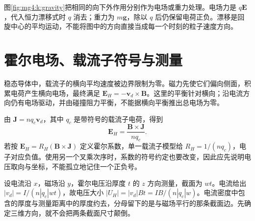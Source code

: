图\ref{fig:mg4:k:gravity}把相同的向下外作用分别作为电场或重力处理。电场力是 $q\bm E$，代入恒力漂移式时 $q$ 消去；重力为 $m\bm g$，除以 $q$ 后仍保留电荷正负。漂移是回旋中心的平均运动，不能将图中的方向直接当成每一个时刻的粒子速度方向。



\section{霍尔电场、载流子符号与测量}
稳态导体中，载流子的横向平均速度被边界限制为零。磁力先使它们偏向侧面，积累电荷产生横向电场，最终满足 $\bm E_H=-\bm v_d\times\bm B$。这里的平衡针对横向；沿电流方向仍有电场驱动，并由碰撞阻力平衡，不能据横向平衡推出总电场为零。


由 $\bm J=nq_c\bm v_d$，其中 $q_c$ 是带符号的载流子电荷，得到
\[
\bm E_H=\frac{\bm B\times\bm J}{nq_c}.
\]
若按 $\bm E_H=R_H(\bm B\times\bm J)$ 定义霍尔系数，单一载流子模型给 $R_H=1/(nq_c)$，电子对应负值。使用另一个叉乘次序时，系数的符号约定也要改变，因此应先说明电压取向与坐标，不能孤立地记住一个正负号。


设电流沿 $x$，磁场沿 $y$，霍尔电压沿厚度 $t$ 的 $z$ 方向测量，截面为 $wt$。电流给出 $|v_d|=I/(n|q_c|wt)$，故电压大小 $|U_H|=|v_d|Bt=IB/(n|q_c|w)$。电流密度中包含的厚度与测量距离中的厚度约去，分母留下的是与磁场平行的那条截面边。先确定三维方向，就不会把两条截面尺寸颠倒。



